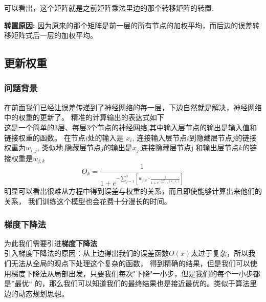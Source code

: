 \documentclass[12pt]{article}
\begin{document}
    可以看出，这个矩阵就是之前矩阵乘法里边的那个转移矩阵的转置.
    
    \textbf{转置原因:}
    {\kaishu 因为原来的那个矩阵是前一层的所有节点的加权平均，而后边的误差转移矩阵式后一层的加权平均。}

    \subsection{更新权重}
    \subsubsection{问题背景}
    在前面我们已经让误差传递到了神经网络的每一层，下边自然就是解决，神经网络中的权重的更新了。
    精准的计算输出的表达式如下\\
    这是一个简单的3层、每层3个节点的神经网络,其中输入层节点的输出是输入值和链接权重的函数。
    在节点$i$处的输入是
    $x_i$, 连接输入层节点$i$到隐藏层节点$j$的链接权重为$w_{i,j}$,
    类似地,隐藏层节点$j$的输出是$x_j$,连接隐藏层节点$\mathrm{j}$  
    和输出层节点$k$的链接权重是$w_{j,k}$
    \begin{equation}
        O_{k}=
        \frac{1}{1+e^{-\sum_{j=1}^{3}{[w_{j, k}\cdot 
        \frac{1}{1+e^{-\sum_{i=1}^{3}\left(w_{i, j} x_{i}\right)}}
        ]}}}
        \label{Output}
    \end{equation}
    明显可以看出很难从方程中得到误差与权重的关系，而且即使能够计算出来他们的关系，
    我们训练这个模型也会花费十分漫长的时间。
    \subsubsection{梯度下降法}
    为此我们需要引进\textbf{梯度下降法}\\
    引入梯度下降法的原因：从上边得出我们的误差函数$O(x)$太过于复杂，所以我们无法从全局的观点下处理这个复杂的函数，
    得到精确的结果，但是我们可以使用梯度下降法从局部出发，只要我们每次"下降"一小步，但是我们的每个一小步都是”最优“
    的，那么我们可以知道我们的最终结果也是接近最优的。类似于算法里边的动态规划思想。
\end{document}
